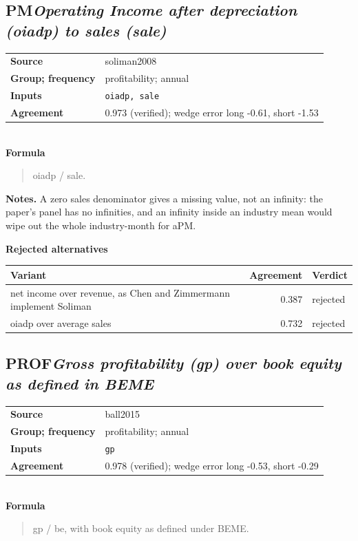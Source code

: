\documentclass[11pt]{article}
\begin{document}
\subsection*{PM\quad\normalfont\itshape Operating Income after depreciation (oiadp) to sales (sale)}
\begin{tabular}{@{}p{3.3cm}p{12.3cm}@{}}
\textbf{Source} & soliman2008\\
\textbf{Group; frequency} & profitability; annual\\
\textbf{Inputs} & \texttt{oiadp, sale}\\
\textbf{Agreement} & 0.973 (verified); wedge error long -0.61, short -1.53\\
\end{tabular}\\[4pt]
\textbf{Formula}
\begin{quote}\small
oiadp / sale.\\

\end{quote}
\textbf{Notes.} A zero sales denominator gives a missing value, not an infinity: the paper's panel has no infinities, and an infinity inside an industry mean would wipe out the whole industry-month for aPM.

\textbf{Rejected alternatives}\\[2pt]
{\small\begin{longtable}{@{}p{9.6cm}rp{4.3cm}@{}}
\toprule Variant & Agreement & Verdict\\\midrule\endhead
net income over revenue, as Chen and Zimmermann implement Soliman & 0.387 & rejected\\
oiadp over average sales & 0.732 & rejected\\
\bottomrule\end{longtable}}
\subsection*{PROF\quad\normalfont\itshape Gross profitability (gp) over book equity as defined in BEME}
\begin{tabular}{@{}p{3.3cm}p{12.3cm}@{}}
\textbf{Source} & ball2015\\
\textbf{Group; frequency} & profitability; annual\\
\textbf{Inputs} & \texttt{gp}\\
\textbf{Agreement} & 0.978 (verified); wedge error long -0.53, short -0.29\\
\end{tabular}\\[4pt]
\textbf{Formula}
\begin{quote}\small
gp / be, with book equity as defined under BEME.\\

\end{quote}
\end{document}

